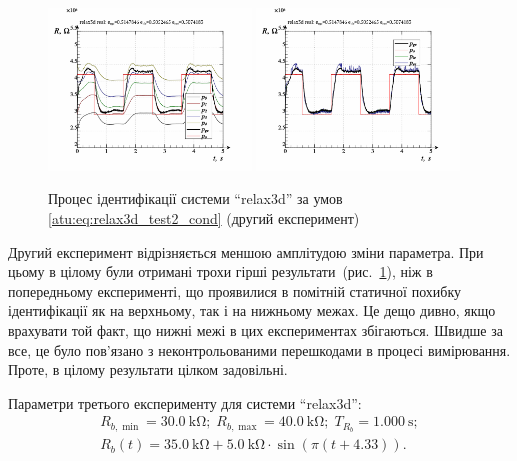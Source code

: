 \begin{figure}[htb!]
  \centerline{
    \includegraphics[width=0.48\textwidth]{p/relax3d_read_id2-p_p_01.png}
    \hfill
    \includegraphics[width=0.48\textwidth]{p/relax3d_read_id2-p_pp_01.png}
  }
\caption{Процес ідентифікації системи ``relax3d'' за умов \ref{atu:eq:relax3d_test2_cond} (другий експеримент)}
\label{atu:f:relax3d_id_2}
\end{figure}

Другий експеримент відрізняється меншою амплітудою зміни
параметра. При цьому в цілому були отримані трохи гірші
результати~(рис.~\ref{atu:f:relax3d_id_2}), ніж в попередньому експерименті,
що проявилися в помітній статичної похибку ідентифікації як на
верхньому, так і на нижньому межах. Це дещо дивно, якщо врахувати
той факт, що нижні межі в цих експериментах збігаються. Швидше за
все, це було пов'язано з неконтрольованими перешкодами в процесі
вимірювання. Проте, в цілому результати цілком задовільні.



Параметри третього експерименту для системи ``relax3d'':
%
\begin{equation}
  \begin{array}{c}
    R_{b,\min} = \SI{30.0}{\kilo\ohm};
    \;
    R_{b,\max} = \SI{40.0}{\kilo\ohm};
    \;
    T_{R_b} = \SI{1.000}{\second};
  \\
    R_b(t) = \SI{35.0}{\kilo\ohm} + \SI{5.0}{\kilo\ohm} \cdot \sin( \pi ( t + 4.33 ) ).
  \end{array}
  \label{atu:eq:relax3d_test3_cond}
\end{equation}

